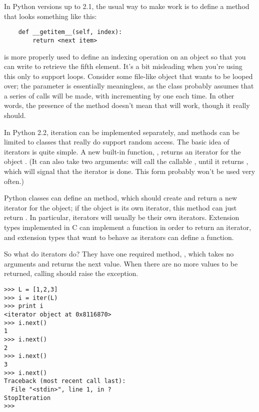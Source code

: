 \documentclass{howto}
\begin{document}
In Python versions up to 2.1, the usual way to make  work is to define a  method that looks
something like this:

\begin{verbatim}
    def __getitem__(self, index):
        return <next item>
\end{verbatim}

 is more properly used to define an indexing
operation on an object so that you can write  to retrieve
the fifth element.  It's a bit misleading when you're using this only
to support  loops.  Consider some file-like object that
wants to be looped over; the  parameter is essentially
meaningless, as the class probably assumes that a series of
 calls will be made, with 
incrementing by one each time.  In other words, the presence of the
 method doesn't mean that  will
work, though it really should.

In Python 2.2, iteration can be implemented separately, and
 methods can be limited to classes that really
do support random access.  The basic idea of iterators is quite
simple.  A new built-in function, , returns an
iterator for the object .  (It can also take two arguments:
 will call the callable , until it
returns , which will signal that the iterator is done.  This form probably won't be used very often.)

Python classes can define an  method, which should
create and return a new iterator for the object; if the object is its
own iterator, this method can just return .  In particular,
iterators will usually be their own iterators.  Extension types
implemented in C can implement a  function in order to
return an iterator, and extension types that want to behave as
iterators can define a  function.

So what do iterators do?  They have one required method,
, which takes no arguments and returns the next value.
When there are no more values to be returned, calling 
should raise the  exception.

\begin{verbatim}
>>> L = [1,2,3]
>>> i = iter(L)
>>> print i
<iterator object at 0x8116870>
>>> i.next()
1
>>> i.next()
2
>>> i.next()
3
>>> i.next()
Traceback (most recent call last):
  File "<stdin>", line 1, in ?
StopIteration
>>>      
\end{verbatim}
\end{document}
